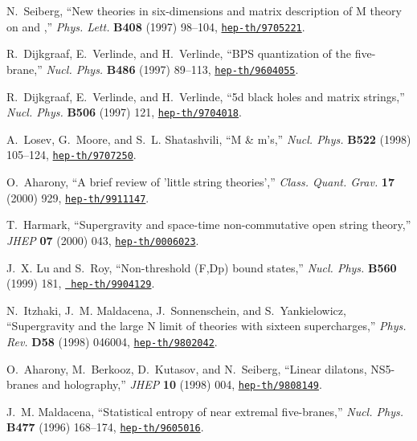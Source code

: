 \documentclass[a4paper,twoside,titlepage,12pt]{article}
\begin{document}
\begin{thebibliography}{10}
N.~Seiberg, ``New theories in six-dimensions and matrix description of {M}
  theory on {\coordHE{}} and {\coordHE{}},'' {\em Phys. Lett.} {\bf B408} (1997)
  98--104, \href{http://xxx.lanl.gov/abs/hep-th/9705221}{{\tt hep-th/9705221}}.

R.~Dijkgraaf, E.~Verlinde, and H.~Verlinde, ``{BPS} quantization of the
  five-brane,'' {\em Nucl. Phys.} {\bf B486} (1997) 89--113,
  \href{http://xxx.lanl.gov/abs/hep-th/9604055}{{\tt hep-th/9604055}}.

R.~Dijkgraaf, E.~Verlinde, and H.~Verlinde, ``5d black holes and matrix
  strings,'' {\em Nucl. Phys.} {\bf B506} (1997) 121,
  \href{http://xxx.lanl.gov/abs/hep-th/9704018}{{\tt hep-th/9704018}}.

A.~Losev, G.~Moore, and S.~L. Shatashvili, ``M {\&} m's,'' {\em Nucl. Phys.}
  {\bf B522} (1998) 105--124,
  \href{http://xxx.lanl.gov/abs/hep-th/9707250}{{\tt hep-th/9707250}}.

O.~Aharony, ``A brief review of 'little string theories','' {\em Class. Quant.
  Grav.} {\bf 17} (2000) 929,
  \href{http://xxx.lanl.gov/abs/hep-th/9911147}{{\tt hep-th/9911147}}.

T.~Harmark, ``Supergravity and space-time non-commutative open string theory,''
  {\em JHEP} {\bf 07} (2000) 043,
  \href{http://xxx.lanl.gov/abs/hep-th/0006023}{{\tt hep-th/0006023}}.

J.~X. Lu and S.~Roy, ``Non-threshold {(F,Dp)} bound states,'' {\em Nucl. Phys.}
  {\bf B560} (1999) 181, \href{http://xxx.lanl.gov/abs/hep-th/9904129}{{\tt
  hep-th/9904129}}.

N.~Itzhaki, J.~M. Maldacena, J.~Sonnenschein, and S.~Yankielowicz,
  ``Supergravity and the large {N} limit of theories with sixteen
  supercharges,'' {\em Phys. Rev.} {\bf D58} (1998) 046004,
  \href{http://xxx.lanl.gov/abs/hep-th/9802042}{{\tt hep-th/9802042}}.

O.~Aharony, M.~Berkooz, D.~Kutasov, and N.~Seiberg, ``Linear dilatons,
  {NS5-branes} and holography,'' {\em JHEP} {\bf 10} (1998) 004,
  \href{http://xxx.lanl.gov/abs/hep-th/9808149}{{\tt hep-th/9808149}}.

J.~M. Maldacena, ``Statistical entropy of near extremal five-branes,'' {\em
  Nucl. Phys.} {\bf B477} (1996) 168--174,
  \href{http://xxx.lanl.gov/abs/hep-th/9605016}{{\tt hep-th/9605016}}.


\end{thebibliography}
\end{document}
